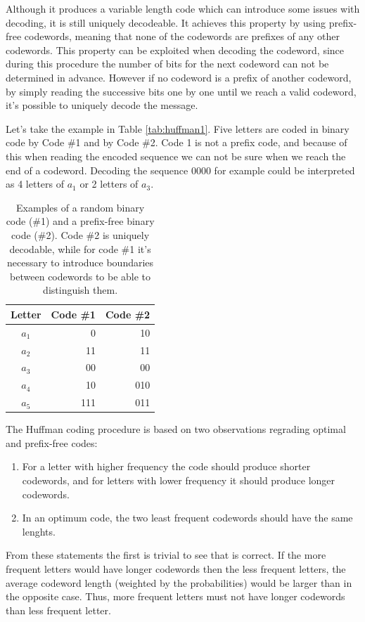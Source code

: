 \documentclass{diploma_style}
\begin{document}
Although it produces a variable length code which can introduce some issues with decoding, it is still uniquely decodeable. It achieves this property by using prefix-free codewords, meaning that none of the codewords are prefixes of any other codewords. This property can be exploited when decoding the codeword, since during this procedure the number of bits for the next codeword can not be determined in advance. However if no codeword is a prefix of another codeword, by simply reading the successive bits one by one until we reach a valid codeword, it's possible to uniquely decode the message.

Let's take the example in Table \ref{tab:huffman1}. Five letters are coded in binary code by Code \#1 and by Code \#2. Code 1 is not a prefix code, and because of this when reading the encoded sequence we can not be sure when we reach the end of a codeword. Decoding the sequence 0000 for example could be interpreted as 4 letters of $a_1$ or 2 letters of $a_3$.

\begin{table}
\caption{Examples of a random binary code (\#1) and a prefix-free binary code (\#2). Code \#2 is uniquely decodable, while for code \#1 it's necessary to introduce boundaries between codewords to be able to distinguish them.}
\centering
\begin{tabular}{crr}
\toprule
Letter & Code \#1 & Code \#2 \\
\midrule
$a_1$ & 0	& 10 \\
$a_2$ & 11	& 11 \\
$a_3$ & 00	& 00 \\
$a_4$ & 10 	& 010 \\
$a_5$ & 111	& 011 \\
\bottomrule
\end{tabular}
\label{tab:prefix}
\end{table}

The Huffman coding procedure is based on two observations regrading optimal and prefix-free codes:
\begin{enumerate}
\item For a letter with higher frequency the code should produce shorter codewords, and for letters with lower frequency it should produce longer codewords.
\item In an optimum code, the two least frequent codewords should have the same lenghts.
\end{enumerate}

From these statements the first is trivial to see that is correct. If the more frequent letters would have longer codewords then the less frequent letters, the average codeword length (weighted by the probabilities) would be larger than in the opposite case. Thus, more frequent letters must not have longer codewords than less frequent letter.
\end{document}
